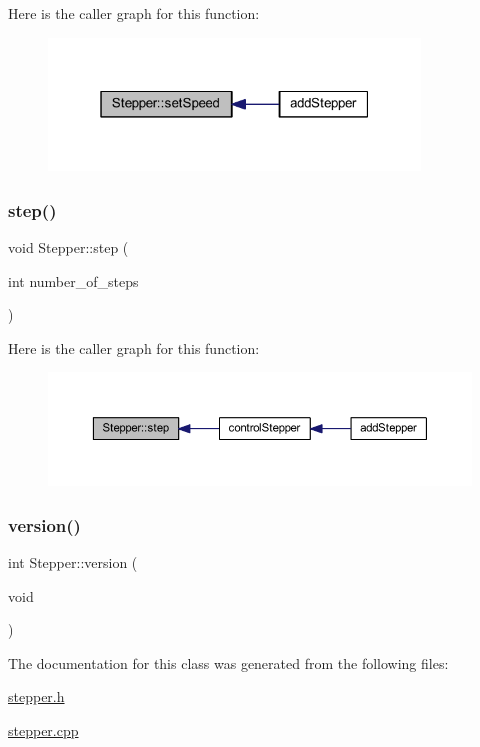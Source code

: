 Here is the caller graph for this function\+:\nopagebreak
\begin{figure}[H]
\begin{center}
\leavevmode
\includegraphics[width=280pt]{class_stepper_a89a1f8b30656437bba8732721d5671e2_icgraph}
\end{center}
\end{figure}
\mbox{\label{class_stepper_a23f1ada8f077bcb8691009648cf29f27}} 
\subsubsection{\texorpdfstring{step()}{step()}}
{\footnotesize\ttfamily void Stepper\+::step (\begin{DoxyParamCaption}\item[{int}]{number\+\_\+of\+\_\+steps }\end{DoxyParamCaption})}

Here is the caller graph for this function\+:\nopagebreak
\begin{figure}[H]
\begin{center}
\leavevmode
\includegraphics[width=350pt]{class_stepper_a23f1ada8f077bcb8691009648cf29f27_icgraph}
\end{center}
\end{figure}
\mbox{\label{class_stepper_a2b737f8eb9641728af2fb1c24a2560da}} 
\subsubsection{\texorpdfstring{version()}{version()}}
{\footnotesize\ttfamily int Stepper\+::version (\begin{DoxyParamCaption}\item[{void}]{ }\end{DoxyParamCaption})}



The documentation for this class was generated from the following files\+:\begin{DoxyCompactItemize}
\item 
\hyperlink{stepper_8h}{stepper.\+h}\item 
\hyperlink{stepper_8cpp}{stepper.\+cpp}\end{DoxyCompactItemize}
